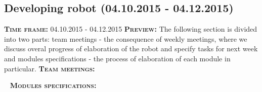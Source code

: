 \subsection{Developing robot (04.10.2015 - 04.12.2015)}
	\textsc{\textbf{Time frame:}} 04.10.2015 - 04.12.2015 \newline
	\textsc{\textbf{Preview:}} The following section is divided into two parts: team meetings - the consequence of weekly meetings, where we discuss overal progress of elaboration of the robot and specify tasks for next week and modules specifications - the process of elaboration of each module in particular.  \newline \newline
	\textsc{\textbf{Team meetings:}}
	
	
   \newline
  \textsc{\textbf{Modules specifications:}}
  
  
